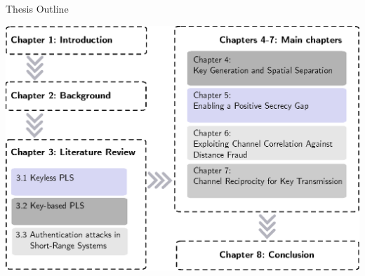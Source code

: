 \subsection*{}
\begin{frame}{Thesis Outline}
\begin{center}
\includegraphics[width=0.9\linewidth]{slides/figures/outline.eps}
\end{center}

\end{frame}